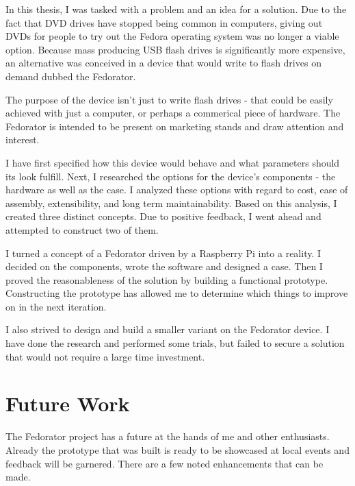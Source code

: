 \label{Conclusion}
        
        In this thesis, I was tasked with a problem and an idea for a solution.  Due to the fact that DVD drives have stopped being common in computers, giving out DVDs for people to try out the Fedora operating system was no longer a viable option.  Because mass producing USB flash drives is significantly more expensive, an alternative was conceived in a device that would write to flash drives on demand dubbed the Fedorator.
        
        The purpose of the device isn't just to write flash drives - that could be easily achieved with just a computer, or perhaps a commerical piece of hardware.  The Fedorator is intended to be present on marketing stands and draw attention and interest.
        
        I have first specified how this device would behave and what parameters should its look fulfill.  Next, I researched the options for the device's components - the hardware as well as the case.  I analyzed these options with regard to cost, ease of assembly, extensibility, and long term maintainability.  Based on this analysis, I created three distinct concepts.  Due to positive feedback, I went ahead and attempted to construct two of them.
        
        I turned a concept of a Fedorator driven by a Raspberry Pi into a reality.  I decided on the components, wrote the software and designed a case.  Then I proved the reasonableness of the solution by building a functional prototype.  Constructing the prototype has allowed me to determine which things to improve on in the next iteration.
        
        I also strived to design and build a smaller variant on the Fedorator device.  I have done the research and performed some trials, but failed to secure a solution that would not require a large time investment.%

        
        
    \section{Future Work}
        The Fedorator project has a future at the hands of me and other enthusiasts.  Already the prototype that was built is ready to be showcased at local events and feedback will be garnered.  There are a few noted enhancements that can be made.
        
        
        
